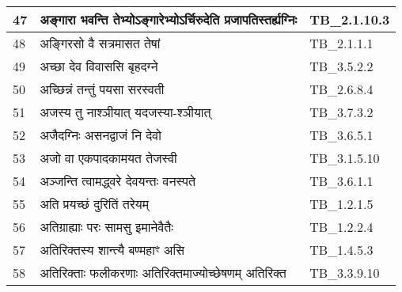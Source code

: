 \documentclass[17pt]{extarticle}
\begin{document}
\begin{longtable}{||p{0.4in}||p{4.9in}||p{0.9in}||}
    \hline
        
    47 & अङ्गारा भवन्ति तेभ्योऽङ्गारेभ्योऽर्चिरुदेति प्रजापतिस्तर्ह्यग्निः & TB\_2.1.10.3       \\
    
    \hline
        
    48 & अङ्गिरसो वै सत्रमासत तेषां & TB\_2.1.1.1       \\
    
    \hline
        
    49 & अच्छा देव विवाससि बृहदग्ने & TB\_3.5.2.2       \\
    
    \hline
        
    50 & अच्छिन्नं तन्तुं पयसा सरस्वती & TB\_2.6.8.4       \\
    
    \hline
        
    51 & अजस्य तु नाश्ञीयात् यदजस्या{-}श्ञीयात् & TB\_3.7.3.2       \\
    
    \hline
        
    52 & अजैदग्निः असनद्वाजं नि देवो & TB\_3.6.5.1       \\
    
    \hline
        
    53 & अजो वा एकपादकामयत तेजस्वी & TB\_3.1.5.10       \\
    
    \hline
        
    54 & अञ्जन्ति त्वामद्ध्वरे देवयन्तः वनस्पते & TB\_3.6.1.1       \\
    
    \hline
        
    55 & अति प्रयच्छं दुरितिं तरेयम् & TB\_1.2.1.5       \\
    
    \hline
        
    56 & अतिग्राह्याः परः सामसु इमानेवैतैः & TB\_1.2.2.4       \\
    
    \hline
        
    57 & अतिरिक्तस्य शान्त्यै बण्महाꣳ असि & TB\_1.4.5.3       \\
    
    \hline
        
    58 & अतिरिक्ताः फलीकरणाः अतिरिक्तमाज्योच्छेषणम् अतिरिक्त & TB\_3.3.9.10       \\
    
    \hline
        

\end{longtable}
\end{document}
